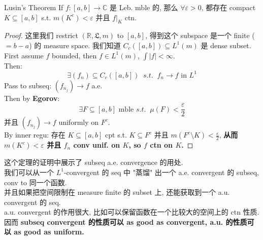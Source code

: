 \documentclass[lang=cn,11pt]{elegantbook}
\begin{document}
\begin{theorem}{Lusin's Theorem}
\label{Lusin's Theorem}
    If $f: [a,b] \rightarrow \mathbb{C}$ 是 Leb. mble 的, 那么 $\forall \varepsilon > 0$, 都存在 compact $K \subseteq [a,b]$ s.t. $m(K^c) < \varepsilon$ 并且 $f|_K$ ctn.
\end{theorem}
\begin{proof}
这里我们 restrict $(\mathbb{R}, \mathfrak{L},m)$ to $[a,b]$, 得到这个 subspace 是一个 finite ($=b-a$) 的 measure space. 
我们知道 $C_c([a,b]) \subseteq L^1(m)$ 是 dense subset.\\
First assume $f$ bounded, then $f\in L^1(m)$, $\int|f| < \infty$.\\
Then: \[\exists (f_n)  \subseteq C_c ([a,b])  \;\;s.t. \;\; f_n\rightarrow f \text{ in } L^1 \]
Pass to subseq: $(f_{n_j})\rightarrow f$ a.e.\\
Then by \textbf{Egorov}: \[
\exists F \subseteq [a,b] \text{ mble } s.t. \;\; \mu(F) < \frac{\varepsilon}{2}
\]
并且 $(f_{n_j})\rightarrow f$ uniformly on $F^c$.\\
By inner regu: 存在 $K \subseteq [a,b] $ cpt s.t. $K \subseteq F^c$ 并且 $m(F^c \setminus K ) < \frac{\varepsilon}{2}$, \textbf{从而 $m(K^c) < \varepsilon$ 并且 $f_n$ conv unif. on $K$, so $f$ ctn on $K$.}
\end{proof}
\begin{remark}
    这个定理的证明中展示了 subseq a.e. convergence 的用处. \\
    我们可以从一个 $L^1$-convergent 的 seq 中 "蒸馏" 出一个 a.e. convergent 的 subseq, conv to 同一个函数. \\
    并且如果把空间限制在 measure finite 的 subset 上, 还能获取到一个 a.u. convergent 的 seq.\\ 
    a.u. convergent 的作用很大, 比如可以保留函数在一个比较大的空间上的 ctn 性质.\\
    因而 \textbf{subseq convergent 的性质可以 as good as convergent, a.u. 的性质可以 as good as uniform.}
\end{remark}
\end{document}
